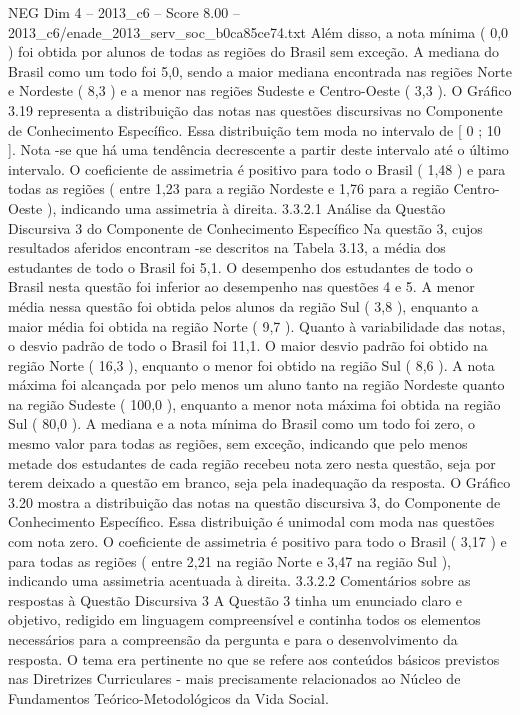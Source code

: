 \begin{textsample}{NEG Dim 4 – 2013\_c6 – Score 8.00 – 2013\_c6/enade\_2013\_serv\_soc\_b0ca85ce74.txt}
Além disso, a nota mínima ( 0,0 ) foi obtida por alunos de todas as regiões do Brasil sem exceção.
A mediana do Brasil como um todo foi 5,0, sendo a maior mediana encontrada nas regiões Norte e Nordeste ( 8,3 ) e a menor nas regiões Sudeste e Centro-Oeste ( 3,3 ).
O Gráfico 3.19 representa a distribuição das notas nas questões discursivas no Componente de Conhecimento Específico.
Essa distribuição tem moda no intervalo de [ 0 ; 10 ].
Nota -se que há uma tendência decrescente a partir deste intervalo até o último intervalo.
O coeficiente de assimetria é positivo para todo o Brasil ( 1,48 ) e para todas as regiões ( entre 1,23 para a região Nordeste e 1,76 para a região Centro-Oeste ), indicando uma assimetria à direita. 3.3.2.1 Análise da Questão Discursiva 3 do Componente de Conhecimento Específico Na questão 3, cujos resultados aferidos encontram -se descritos na Tabela 3.13, a média dos estudantes de todo o Brasil foi 5,1.
O desempenho dos estudantes de todo o Brasil nesta questão foi inferior ao desempenho nas questões 4 e 5.
A menor média nessa questão foi obtida pelos alunos da região Sul ( 3,8 ), enquanto a maior média foi obtida na região Norte ( 9,7 ).
Quanto à variabilidade das notas, o desvio padrão de todo o Brasil foi 11,1.
O maior desvio padrão foi obtido na região Norte ( 16,3 ), enquanto o menor foi obtido na região Sul ( 8,6 ).
A nota máxima foi alcançada por pelo menos um aluno tanto na região Nordeste quanto na região Sudeste ( 100,0 ), enquanto a menor nota máxima foi obtida na região Sul ( 80,0 ).
A mediana e a nota mínima do Brasil como um todo foi zero, o mesmo valor para todas as regiões, sem exceção, indicando que pelo menos metade dos estudantes de cada região recebeu nota zero nesta questão, seja por terem deixado a questão em branco, seja pela inadequação da resposta.
O Gráfico 3.20 mostra a distribuição das notas na questão discursiva 3, do Componente de Conhecimento Específico.
Essa distribuição é unimodal com moda nas questões com nota zero.
O coeficiente de assimetria é positivo para todo o Brasil ( 3,17 ) e para todas as regiões ( entre 2,21 na região Norte e 3,47 na região Sul ), indicando uma assimetria acentuada à direita. 3.3.2.2 Comentários sobre as respostas à Questão Discursiva 3 A Questão 3 tinha um enunciado claro e objetivo, redigido em linguagem compreensível e continha todos os elementos necessários para a compreensão da pergunta e para o desenvolvimento da resposta.
O tema era pertinente no que se refere aos conteúdos básicos previstos nas Diretrizes Curriculares - mais precisamente relacionados ao Núcleo de Fundamentos Teórico-Metodológicos da Vida Social.

\end{textsample}
